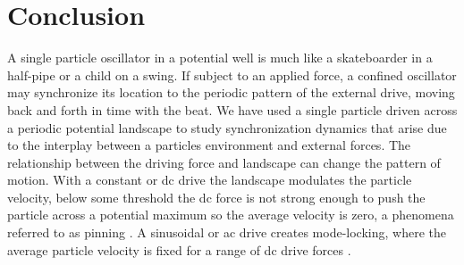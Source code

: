 \documentclass[twocolumn,preprintnumbers,amsmath,amssymb,aps,prx]{revtex4}
\begin{document}
\section{Conclusion}
\label{sec:conclusion}	%
A single particle oscillator
in a potential well is 
much like a skateboarder in a half-pipe or
a child on a swing.
If subject to an applied force,
a confined oscillator may 
synchronize its location
to the periodic pattern of the external drive,
moving back and forth in time with
the beat. 
We have used 
a single particle driven across a periodic potential landscape 
to study synchronization dynamics
that arise due to the interplay
between a particles environment and external forces.
The relationship between the driving force and
landscape can change the pattern of motion.  
With a constant or 
dc drive the landscape modulates 
the particle velocity, below some threshold  
the dc force is not strong enough to push the particle
across a potential maximum so the average velocity is zero,
a phenomena referred to as pinning \cite{Reichhardt2017}.  
A sinusoidal or ac drive creates mode-locking,
where the average particle velocity
is fixed for a range of dc drive forces \cite{Reichhardt2015}.
\end{document}
